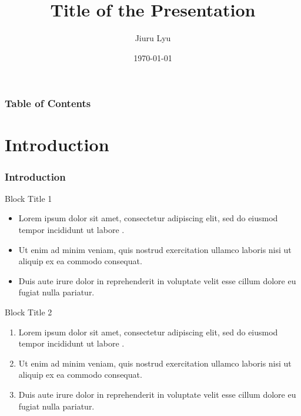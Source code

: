 

\author[My name]{Jiuru Lyu}
\title[Name to be Include]{Title of the Presentation}
\date{\today}


\everymath{\displaystyle}

\LogoOn
\begin{frame}
    \titlepage 
\end{frame}
\LogoOff

\begin{frame}
    \frametitle{\textbf{Table of Contents}}
    \tableofcontents %
\end{frame}

\section{Introduction}\label{sec:introduction}
\begin{frame}
\frametitle{\textbf{Introduction}}
\begin{block}{Block Title 1}
\begin{itemize}
    \item Lorem ipsum dolor sit amet, consectetur adipiscing elit, sed do eiusmod tempor incididunt ut labore . 
    \item Ut enim ad minim veniam, quis nostrud exercitation ullamco laboris nisi ut aliquip ex ea commodo consequat.
    \item Duis aute irure dolor in reprehenderit in voluptate velit esse cillum dolore eu fugiat nulla pariatur.  \end{itemize}
\end{block}
    
\begin{exampleblock}{Block Title 2}
\begin{enumerate}
    \item Lorem ipsum dolor sit amet, consectetur adipiscing elit, sed do eiusmod tempor incididunt ut labore . 
    \item Ut enim ad minim veniam, quis nostrud exercitation ullamco laboris nisi ut aliquip ex ea commodo consequat.
    \item Duis aute irure dolor in reprehenderit in voluptate velit esse cillum dolore eu fugiat nulla pariatur.  \end{enumerate}
\end{exampleblock}
\end{frame}

